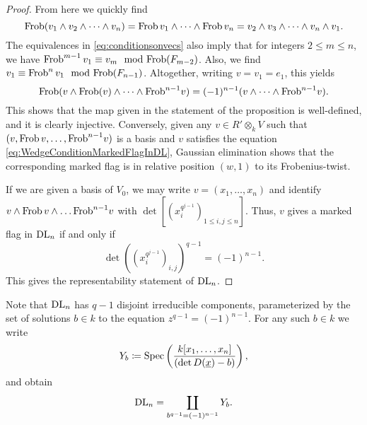 \documentclass[../main.tex]{subfiles}
\begin{document}
\begin{prop}
\begin{proof}
  From here we quickly find
  \begin{equation*}
    \mathrm{Frob}(v_1 \wedge v_2 \wedge \dots \wedge v_n) = 
    \mathrm{Frob}\, v_1 \wedge \dots \wedge \mathrm{Frob}\, v_n = v_2 \wedge v_3
    \wedge \dots \wedge v_{n} \wedge v_1.
  \end{equation*}
  The equivalences in \eqref{eq:conditionsonvecs} also imply that for integers
  $2 \leq m \leq n$, we have $\mathrm{Frob}^{m-1} \, v_1
  \equiv v_m \mod {\mathrm{Frob}}(F_{m-2})$. Also, we find $v_1 \equiv \mathrm{Frob}^n \, v_1 \mod {\mathrm{Frob}}
  (F_{n-1})$. Altogether, writing $v = v_1 = e_1$, this yields 
  \begin{equation}\label{eq:WedgeConditionMarkedFlagInDL}
    \mathrm{Frob} (v \wedge \mathrm{Frob}(v) \wedge \dots \wedge \mathrm{Frob}^{n-1} v) = 
    (-1)^{n-1} (v \wedge \dots \wedge \mathrm{Frob}^{n-1}v).
  \end{equation}
  This shows that the map given in the statement of the proposition is
  well-defined, and it is clearly injective. Conversely,
  given any $v \in R' \otimes_k V$ such that $(v, \mathrm{Frob}\, v, \dots, \mathrm{Frob}^{n-1} v)$
  is a basis and $v$ satisfies the equation \eqref{eq:WedgeConditionMarkedFlagInDL},
  Gaussian elimination shows that the corresponding marked flag is in relative
  position $(w,1)$ to its Frobenius-twist.

  If we are given a basis of $V_0$, we may write $v = (x_1, \dots, x_n)$
  and identify $v \wedge \mathrm{Frob}\, v \wedge \dots \mathrm{Frob}^{n-1} v$ with
  $\det\left[ (x_i^{q^{j-1}})_{1 \leq i,j \leq n} \right]$.
  Thus, $v$ gives a marked flag in $\mathrm{DL}_n$ if and only if
  \begin{equation*}
    \det((x_i^{q^{j-1}})_{i,j})^{q-1} = (-1)^{n-1}.
  \end{equation*}
  This gives the representability statement of $\mathrm{DL}_n$.
\end{proof}
\end{prop}

Note that $\mathrm{DL}_n$ has $q-1$ disjoint irreducible components, parameterized by the set
of solutions $b \in k$ to the equation $z^{q-1}=(-1)^{n-1}$. For any such $b
\in k$ we write 
\begin{equation}\label{eq:DefYb}
  Y_b \coloneqq \operatorname{Spec} \left(\frac{k[x_1, \dots, x_n]}{(\det D(\underline x) - b)}\right),
\end{equation}
and obtain $$\mathrm{DL}_n = \coprod_{b^{q-1} = (-1)^{n-1}} Y_b.$$
\end{document}
